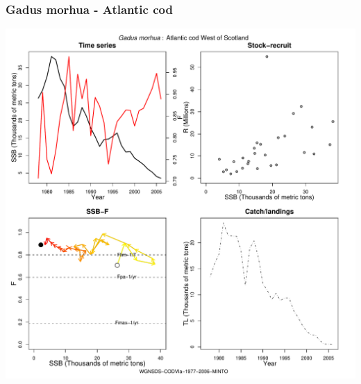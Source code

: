 \subsubsection{Gadus morhua - Atlantic cod}
\begin{center}
\includegraphics[width=1.2\textwidth]{../R/figures/WGNSDS-CODVIa-1977-2006-MINTO.pdf}
\end{center}


